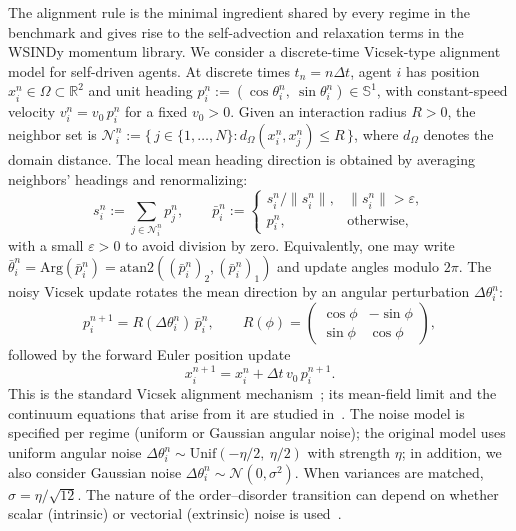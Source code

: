 The alignment rule is the minimal ingredient shared by every regime in the
benchmark and gives rise to the self-advection and relaxation terms in the
WSINDy momentum library.
We consider a discrete-time Vicsek-type alignment model for self-driven agents. At discrete times
$t_n=n\Delta t$, agent $i$ has position $x_i^n\in\Omega\subset\mathbb{R}^2$ and unit heading
$p_i^n := (\cos\theta_i^n,\ \sin\theta_i^n)\in\mathbb{S}^1$, with constant-speed velocity $v_i^n=v_0\,p_i^n$ for a fixed $v_0>0$.
Given an interaction radius $R>0$, the neighbor set is $\mathcal{N}_i^n := \{\, j\in\{1,\dots,N\} : d_\Omega(x_i^n,x_j^n) \le R \,\}$, where $d_\Omega$ denotes the domain distance. The local mean heading direction is obtained by averaging neighbors' headings and renormalizing:
\[
s_i^n := \sum_{j\in\mathcal{N}_i^n} p_j^n,
\qquad
\bar p_i^n :=
\begin{cases}
s_i^n/\|s_i^n\|, & \|s_i^n\|>\varepsilon,\\
p_i^n, & \text{otherwise},
\end{cases}
\]
with a small $\varepsilon>0$ to avoid division by zero.
\noindent Equivalently, one may write $\bar\theta_i^n=\mathrm{Arg}(\bar p_i^n)=\mathrm{atan2}((\bar p_i^n)_2,(\bar p_i^n)_1)$ and update angles modulo $2\pi$. The noisy Vicsek update rotates the mean direction by an angular perturbation $\Delta\theta_i^n$:
\begin{equation}
p_i^{n+1} = R(\Delta\theta_i^n)\,\bar p_i^n,
\qquad
R(\phi)=
\begin{pmatrix}
\cos\phi & -\sin\phi\\
\sin\phi & \cos\phi
\end{pmatrix},
\label{eq:vicsek_heading_vec}
\end{equation}
followed by the forward Euler position update
\begin{equation}
x_i^{n+1} = x_i^n + \Delta t\,v_0\,p_i^{n+1}.
\label{eq:vicsek_position}
\end{equation}
This is the standard Vicsek alignment mechanism~\cite{vicsek1995vicsek,ginelli2015physics}; its mean-field limit and the continuum equations that arise from it are studied in~\cite{toner2005hydrodynamics,bertin2006boltzmann,degond2008continuum}.
The noise model is specified per regime (uniform or Gaussian angular noise); the original model uses uniform angular noise
$\Delta\theta_i^n \sim \mathrm{Unif}(-\eta/2,\ \eta/2)$ with strength $\eta$; in addition, we also consider Gaussian noise
$\Delta\theta_i^n \sim \mathcal{N}(0,\sigma^2)$.
When variances are matched, $\sigma = \eta/\sqrt{12}$.
The nature of the order--disorder transition can depend on whether scalar (intrinsic) or vectorial (extrinsic) noise is used~\cite{gregoirechate2004}.

